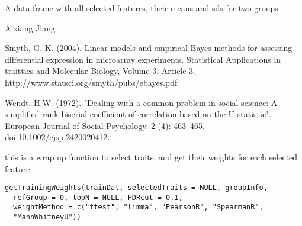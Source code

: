 \documentclass[letterpaper]{book}
\begin{document}
%
\begin{Value}
A data frame with all selected features, their means and sds for two groups
\end{Value}
%
\begin{Author}\relax
Aixiang Jiang
\end{Author}
%
\begin{References}\relax
Smyth, G. K. (2004). Linear models and empirical Bayes methods for assessing differential expression in microarray experiments. 
Statistical Applications in traittics and Molecular Biology, Volume 3, Article 3. http://www.statsci.org/smyth/pubs/ebayes.pdf

Wendt, H.W. (1972). "Dealing with a common problem in social science: A simplified rank-biserial coefficient of correlation 
based on the U statistic". European Journal of Social Psychology. 2 (4): 463–465. doi:10.1002/ejsp.2420020412.
\end{References}
%
\begin{Description}\relax
this is a wrap up function to select traits, and get their weights for each selected feature
\end{Description}
%
\begin{Usage}
\begin{verbatim}
getTrainingWeights(trainDat, selectedTraits = NULL, groupInfo,
  refGroup = 0, topN = NULL, FDRcut = 0.1,
  weightMethod = c("ttest", "limma", "PearsonR", "SpearmanR",
  "MannWhitneyU"))
\end{verbatim}
\end{Usage}
%
\end{document}
